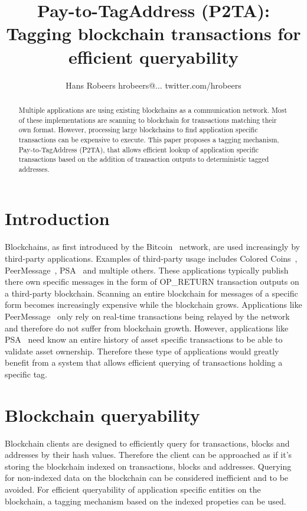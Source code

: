 \documentclass[a4paper,10pt]{article}
\title{Pay-to-TagAddress (P2TA): Tagging blockchain transactions for efficient queryability}
\author{Hans Robeers hrobeers@... twitter.com/hrobeers}
\begin{document}
\maketitle

\begin{abstract}
Multiple applications are using existing blockchains as a communication network.
Most of these implementations are scanning to blockchain for transactions matching their own format.
However, processing large blockchains to find application specific transactions can be expensive to execute.
This paper proposes a tagging mechanism, Pay-to-TagAddress (P2TA), that allows efficient lookup of application specific transactions based on the addition of transaction outputs to deterministic tagged addresses.
\end{abstract}

\doclicenseThis

\section{Introduction}
Blockchains, as first introduced by the Bitcoin~\cite{Nak08} network, are used increasingly by third-party applications.
Examples of third-party usage includes Colored Coins~\cite{Ros12}, PeerMessage~\cite{Emeth}, PSA~\cite{Pchem} and multiple others.
These applications typically publish there own specific messages in the form of OP\_RETURN transaction outputs on a third-party blockchain.
Scanning an entire blockchain for messages of a specific form becomes increasingly expensive while the blockchain grows.
Applications like PeerMessage~\cite{Emeth} only rely on real-time transactions being relayed by the network and therefore do not suffer from blockchain growth.
However, applications like PSA~\cite{Pchem} need know an entire history of asset specific transactions to be able to validate asset ownership.
Therefore these type of applications would greatly benefit from a system that allows efficient querying of transactions holding a specific tag.

\section{Blockchain queryability}
Blockchain clients are designed to efficiently query for transactions, blocks and addresses by their hash values.
Therefore the client can be approached as if it's storing the blockchain indexed on transactions, blocks and addresses.
Querying for non-indexed data on the blockchain can be considered inefficient and to be avoided.
For efficient queryability of application specific entities on the blockchain, a tagging mechanism based on the indexed propeties can be used.
\end{document}
